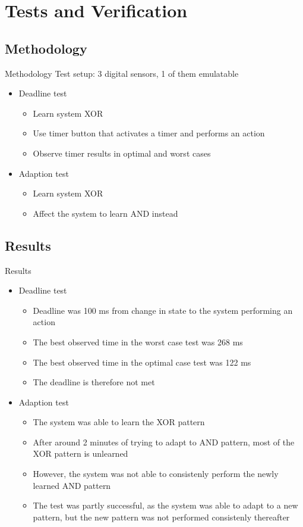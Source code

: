 \section{Tests and Verification}
\subsection{Methodology}
\begin{frame}{Methodology}
  Test setup: 3 digital sensors, 1 of them emulatable
	\begin{itemize}
		\item Deadline test
      \begin{itemize}
        \item Learn system XOR
        \item Use timer button that activates a timer and performs an action
        \item Observe timer results in optimal and worst cases
      \end{itemize}
    \item Adaption test
      \begin{itemize}
        \item Learn system XOR
        \item Affect the system to learn AND instead
      \end{itemize}
	\end{itemize}
\end{frame}

\subsection{Results}
\begin{frame}{Results}
	\begin{itemize}
		\item Deadline test
      \begin{itemize}
        \item Deadline was 100 ms from change in state to the system performing an action
        \item The best observed time in the worst case test was 268 ms
        \item The best observed time in the optimal case test was 122 ms
        \item The deadline is therefore not met
      \end{itemize}
    \item Adaption test
      \begin{itemize}
        \item The system was able to learn the XOR pattern
        \item After around 2 minutes of trying to adapt to AND pattern, most of the XOR pattern is unlearned
        \item However, the system was not able to consistenly perform the newly learned AND pattern
        \item The test was partly successful, as the system was able to adapt to a new pattern, but the new pattern was not performed consistenly thereafter
      \end{itemize}
	\end{itemize}
\end{frame}


